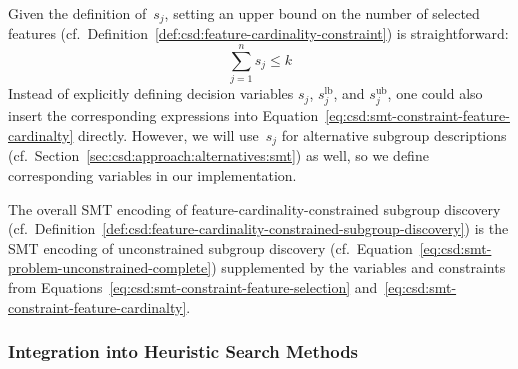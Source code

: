 \documentclass{article}
\theoremstyle{definition}
\begin{document}
Given the definition of~$s_j$, setting an upper bound on the number of selected features (cf.~Definition~\ref{def:csd:feature-cardinality-constraint}) is straightforward:
%
\begin{equation}
	\sum_{j=1}^n s_j \leq k
	\label{eq:csd:smt-constraint-feature-cardinalty}
\end{equation}
%
Instead of explicitly defining decision variables $s_j$, $s^{\text{lb}}_j$, and $s^{\text{ub}}_j$, one could also insert the corresponding expressions into Equation~\ref{eq:csd:smt-constraint-feature-cardinalty} directly.
However, we will use~$s_j$ for alternative subgroup descriptions (cf.~Section~\ref{sec:csd:approach:alternatives:smt}) as well, so we define corresponding variables in our implementation.

The overall SMT encoding of feature-cardinality-constrained subgroup discovery (cf.~Definition~\ref{def:csd:feature-cardinality-constrained-subgroup-discovery}) is the SMT encoding of unconstrained subgroup discovery (cf.~Equation~\ref{eq:csd:smt-problem-unconstrained-complete}) supplemented by the variables and constraints from Equations~\ref{eq:csd:smt-constraint-feature-selection} and~\ref{eq:csd:smt-constraint-feature-cardinalty}.

\subsubsection{Integration into Heuristic Search Methods}
\label{sec:csd:approach:cardinality:heuristics}
\end{document}
